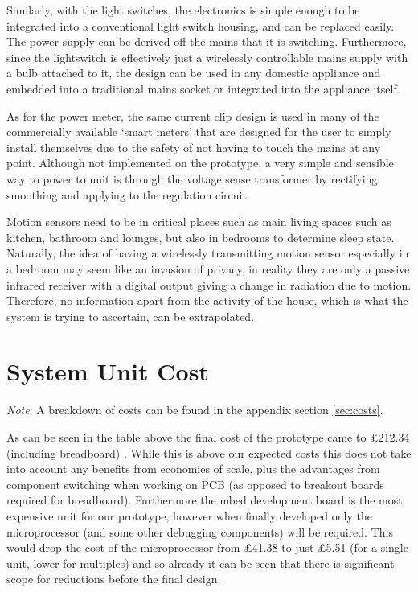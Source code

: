 \documentclass[10.5pt,a4paper,twoside]{report}   %
\begin{document}
Similarly, with the light switches, the electronics is simple enough to be integrated into a conventional light switch housing, and can be replaced easily. The power supply can be derived off the mains that it is switching. Furthermore, since the lightswitch is effectively just a wirelessly controllable mains supply with a bulb attached to it, the design can be used in any domestic appliance and embedded into a traditional mains socket or integrated into the appliance itself.

As for the power meter, the same current clip design is used in many of the commercially available ‘smart meters’ that are designed for the user to simply install themselves due to the safety of not having to touch the mains at any point. Although not implemented on the prototype, a very simple and sensible way to power to unit is through the voltage sense transformer by rectifying, smoothing and applying to the regulation circuit.

Motion sensors need to be in critical places such as main living spaces such as kitchen, bathroom and lounges, but also in bedrooms to determine sleep state. Naturally, the idea of having a wirelessly transmitting motion sensor especially in a bedroom may seem like an invasion of privacy, in reality they are only a passive infrared receiver with a digital output giving a change in radiation due to motion. Therefore, no information apart from the activity of the house, which is what the system is trying to ascertain, can be extrapolated. 
\section{System Unit Cost}
\textit{Note}: A breakdown of costs can be found in the appendix section \ref{sec:costs}.

As can be seen in the table above the final cost of the prototype came to \pounds 212.34 (including breadboard) . While this is above our expected costs this does not take into account any benefits from economies of scale, plus the advantages from component switching when working on PCB (as opposed to breakout boards required for breadboard). Furthermore the mbed development board is the most expensive unit for our prototype, however when finally developed only the microprocessor (and some other debugging components) will be required. This would drop the cost of the microprocessor from \pounds 41.38 to just \pounds 5.51 (for a single unit, lower for multiples) and so already it can be seen that there is significant scope for reductions before the final design.
\end{document}
